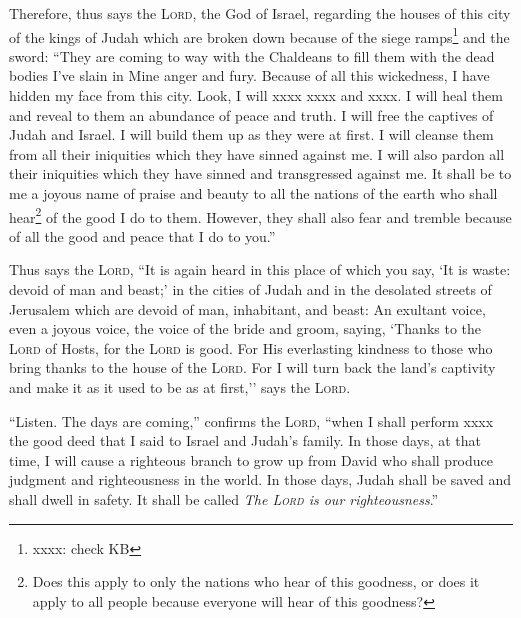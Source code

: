 
\begin{inparaenum}
    
     Therefore, thus says the \textsc{Lord}, the God of Israel, regarding the houses of this city of the kings of Judah which are broken down because of the siege ramps\footnote{xxxx: check KB} and the sword:%
     ``They are coming to way with the Chaldeans to fill them with the dead bodies I've slain in Mine anger and fury. Because of all this wickedness, I have hidden my face from this city.%
     Look, I will xxxx xxxx and xxxx. I will heal them and reveal to them an abundance of peace and truth.%
     I will free the captives of Judah and Israel. I will build them up as they were at first.%
     I will cleanse them from all their iniquities which they have sinned against me. I will also pardon all their iniquities which they have sinned and transgressed against me.%
     It shall be to me a joyous name of praise and beauty to all the nations of the earth who shall hear\footnote{Does this apply to only the nations who hear of this goodness, or does it apply to all people because everyone will hear of this goodness?} of the good I do to them. However, they shall also fear and tremble because of all the good and peace that I do to you.''%
    
     Thus says the \textsc{Lord}, ``It is again heard in this place of which you say, `It is waste: devoid of man and beast;' in the cities of Judah and in the desolated streets of Jerusalem which are devoid of man, inhabitant, and beast:%
     An exultant voice, even a joyous voice, the voice of the bride and groom, saying, `Thanks to the \textsc{Lord} of Hosts, for the \textsc{Lord} is good. For His everlasting kindness to those who bring thanks to the house of the \textsc{Lord}. For I will turn back the land's captivity and make it as it used to be as at first,'' says the \textsc{Lord}.%
    
    
     ``Listen. The days are coming,'' confirms the \textsc{Lord}, ``when I shall perform xxxx the good deed that I said to Israel and Judah's family.%
     In those days, at that time, I will cause a righteous branch to grow up from David who shall produce judgment and righteousness in the world.%
     In those days, Judah shall be saved and shall dwell in safety. It shall be called \textit{The \textsc{Lord} is our righteousness}.''%
    

\end{inparaenum}
